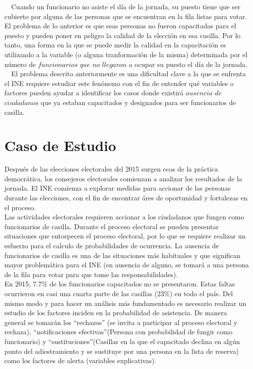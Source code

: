 \documentclass[DIV=calc, 
					paper=letter, 
					fontsize=11pt, 
					twocolumn]{scrartcl}
\begin{document}
~~Cuando un funcionario no asiste el d\'ia de la jornada, su puesto tiene que ser cubierto por alguna de las personas que se encuentran en la fila listas para votar. El problema de lo anterior es que esas personas no fueron capacitadas para el puesto y pueden poner en peligro la calidad de la elecci\'on en esa casilla. Por lo tanto, una forma en la que se puede medir la calidad en la capacitaci\'on es utilizando a la variable (o alguna tranformaci\'on de la misma) determinada por el n\'umero de $funcionarios$ $que$ $no$ $llegaron$ a ocupar su puesto el d\'ia de la jornada.\\

~~El problema descrito anteriormente es una dificultad clave a la que se enfrenta el INE requiere estudiar este fen\'onemo con el fin de entender qu\'e variables o factores pueden ayudar a identificar los casos donde existir\'a $ausencia$ $de$ $ciudadanos$ que ya estaban capacitados y designados para ser funcionarios de casilla.\\

\section{Caso de Estudio}

Despu\'es de las elecciones electorales del 2015 surgen ecos de la pr\'actica democr\'atica, los consejeros electorales  comienzan a analizar los resultados de la jornada. El INE comienza a explorar medidas para accionar de las personas durante las elecciones, con el fin de encontrar \'ares de oportunidad y fortalezas en el proceso.\\

Las actividades electorales requieren accionar a los ciudadanos que fungen como funcionarios de casilla. Durante el proceso electoral se pueden presentar situaciones que entorpecen el proceso electoral, por lo que se requiere realizar un esfuerzo para el calculo de probabilidades de ocurrencia. La ausencia de funcionarios de casilla es una de las situaciones m\'as habituales y que significan mayor problem\'atica para el INE (en ausencia de alguno, se tomar\'a a una persona de la fila para votar para que tome las responsabilidades).\\

En 2015, 7.7\% de los funcionarios capacitados no se presentaron. Estas faltas ocurrieron en casi una cuarta parte de las casillas (23\%) en todo el país. Del mismo modo y para hacer un an\'alisis m\'as fundamentado es necesario realizar un estudio de los factores inciden en la probabilidad de asistencia. De manera general se tomar\'an los “rechazos” (se invita a participar al proceso electoral y rechaza), “notificaciones efectivas”(Persona con probabilidad de fungir como funcionario) y “sustituciones”(Casillas en la que el capacitado declina en alg\'un punto del adiestramiento y se sustituye por una persona en la lista de reserva) como los factores de alerta (variables explicativas).
\vspace{8cm}
\end{document}
